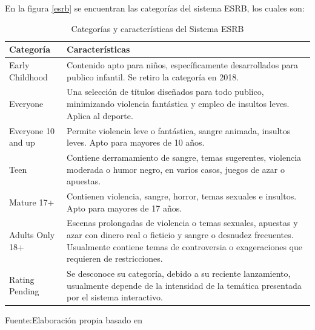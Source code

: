 En la figura \ref{esrb} se encuentran las categorías del sistema ESRB, los cuales son:
\begin{table}[t]
	\begin{center}
		\begin{tabular}{| m{4cm} | m{10cm} | }
			\hline Categoría & Características \\ \hline
			Early Childhood & Contenido apto para niños, específicamente desarrollados para
			publico infantil. Se retiro la categoría en 2018. \\ \hline
			Everyone & Una selección de títulos diseñados para todo publico, minimizando
			violencia fantástica y empleo de insultos leves. Aplica al deporte. \\ \hline
			Everyone 10 and up & Permite violencia leve o fantástica, sangre animada, insultos leves. Apto para mayores de 10 años. \\ \hline
			Teen & Contiene derramamiento de sangre, temas sugerentes, violencia moderada
			o humor negro, en varios casos, juegos de azar o apuestas. \\ \hline
			Mature 17+ & Contienen violencia, sangre, horror, temas sexuales e insultos. Apto
			para mayores de 17 años. \\ \hline
			Adults Only 18+ & Escenas prolongadas de violencia o temas sexuales, apuestas y
			azar con dinero real o ficticio y sangre o desnudez frecuentes. Usualmente contiene
			temas de controversia o exageraciones que requieren de restricciones. \\ \hline
			Rating Pending & Se desconoce su categoría, debido a su reciente lanzamiento,
			usualmente depende de la intensidad de la temática presentada por el sistema
			interactivo. \\ \hline

		\end{tabular}
		\caption{Categorías y características del Sistema ESRB}
		\footnotesize Fuente:Elaboración propia basado en \cite{esrb}
	\end{center}
\end{table}


